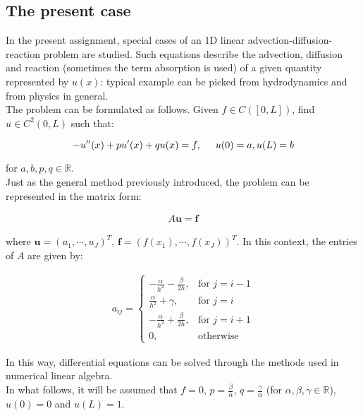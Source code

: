 \documentclass[11pt]{article}
\theoremstyle{theorem}
\theoremstyle{definition}
\begin{document}
\subsection{The present case}
\label{subsec:the-present-case}
In the present assignment, special cases of an 1D linear advection-diffusion-reaction problem are studied. Such equations describe the advection, diffusion and reaction (sometimes the term absorption is used) of a given quantity represented by $u(x)$: typical example can be picked from hydrodynamics and from physics in general.\\
The problem can be formulated as follows. Given $f\in C([0, L])$, find $u\in C^2(0, L)$ such that:

\begin{equation}
	\label{eqn:ass-prob}
	-u''(x)+ pu'(x)+qu(x)= f,\hspace{5mm}u(0)=a, u(L)=b
\end{equation}

for $a, b, p, q\in\mathbb{R}$. \\

Just as the general method previously introduced, the problem can be represented in the matrix form:

\begin{align}
	\label{eqn:matrix-form}
	A\mathbf{u}=\mathbf{f}
\end{align}

where $\mathbf{u}=(u_1, \cdots, u_J)^{T}$, $\mathbf{f}=(f(x_1),\cdots , f(x_J))^{T}$. In this context, the entries of $A$ are given by:

\begin{align}
	\label{eqn:matrix}
	a_{ij} = \begin{cases}
	-\frac{\alpha}{h^2}-\frac{\beta}{2h}, & \text{for } j=i-1\\
	\frac{\alpha}{h^2}+\gamma, & \text{for } j=i\\
	-\frac{\alpha}{h^2}+\frac{\beta}{2h}, & \text{for } j=i+1\\
	0, &\text{otherwise}
	\end{cases}
\end{align}
	
In this way, differential equations can be solved through the methods used in numerical linear algebra.\\

In what follows, it will be assumed that $f=0$,  $p=\frac{\beta}{\alpha}$, $q=\frac{\gamma}{\alpha}$ (for $\alpha, \beta, \gamma\in\mathbb{R}$), $u(0)=0$ and $u(L)=1$.
\end{document}
